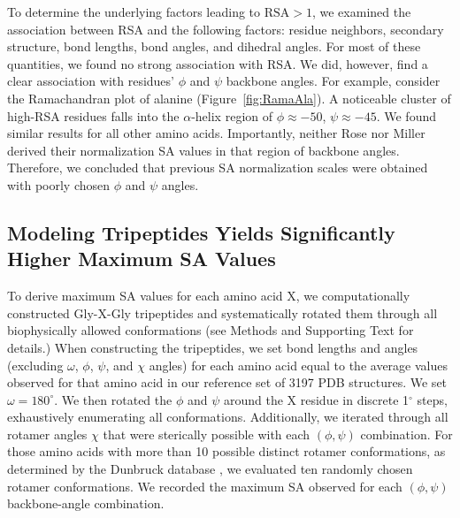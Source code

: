 \documentclass[11pt]{article}
\begin{document}
To determine the underlying factors leading to $\text{RSA}>1$, we examined the association between RSA and the following factors: residue neighbors, secondary structure, bond lengths, bond angles, and dihedral angles. For most of these quantities, we found no strong association with RSA. We did, however, find a clear association with residues' $\phi$ and $\psi$ backbone angles. For example, consider the Ramachandran plot of alanine (Figure~\ref{fig:RamaAla}). A noticeable cluster of high-RSA residues falls into the $\alpha$-helix region of $\phi\approx-50$, $\psi\approx-45$. We found similar results for all other amino acids. Importantly, neither Rose nor Miller derived their normalization SA values in that region of backbone angles. Therefore, we concluded that previous SA normalization scales were obtained with poorly chosen $\phi$ and $\psi$ angles.

\subsection*{Modeling Tripeptides Yields Significantly Higher Maximum SA Values}
To derive maximum SA values for each amino acid X, we computationally constructed Gly-X-Gly tripeptides and systematically rotated them through all biophysically allowed  conformations (see Methods and Supporting Text for details.) When constructing the tripeptides, we set bond lengths and angles (excluding $\omega$, $\phi$, $\psi$, and $\chi$ angles) for each amino acid equal to the average values observed for that amino acid in our reference set of 3197 PDB structures. We set $\omega=180^\circ$. We then rotated the $\phi$ and $\psi$ around the X residue in  discrete 1$^\circ$ steps, exhaustively enumerating all conformations. Additionally, we iterated through all rotamer angles $\chi$ that were sterically possible with each $(\phi, \psi)$ combination. For those amino acids with more than 10 possible distinct rotamer conformations, as determined by the Dunbruck database \cite{WangDunbrack2003}, we evaluated ten randomly chosen rotamer conformations. We recorded the maximum SA observed for each $(\phi, \psi)$ backbone-angle combination.
\end{document}
